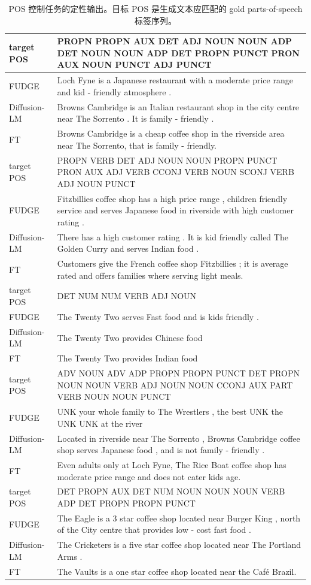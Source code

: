\documentclass{article}
\begin{document}
\begin{table}
{\begin{tabular}{lp{13cm}}
\\
\toprule
target POS &  PROPN PROPN AUX DET ADJ NOUN NOUN ADP DET NOUN NOUN ADP DET PROPN PUNCT PRON AUX NOUN PUNCT ADJ PUNCT\\
\midrule
FUDGE &  Loch Fyne is a Japanese restaurant with a moderate price range and kid - friendly atmosphere . \\
Diffusion-LM &   Browns Cambridge is an Italian restaurant shop in the city centre near The Sorrento . It is family - friendly . \\
FT &  Browns Cambridge is a cheap coffee shop in the riverside area near The Sorrento, that is family - friendly. 
\\
\toprule
target POS &  PROPN VERB DET ADJ NOUN NOUN PROPN PUNCT PRON AUX ADJ VERB CCONJ VERB NOUN SCONJ VERB ADJ NOUN PUNCT\\
\midrule
FUDGE &  Fitzbillies coffee shop has a high price range , children friendly service and serves Japanese food in riverside with high customer rating . \\
Diffusion-LM &   There has a high customer rating . It is kid friendly called The Golden Curry and serves Indian food . \\
FT &  Customers give the French coffee shop Fitzbillies ; it is average rated and offers families where serving light meals. 
\\
\toprule
target POS &  DET NUM NUM VERB ADJ NOUN\\
\midrule
FUDGE &  The Twenty Two serves Fast food and is kids friendly . \\
Diffusion-LM &  The Twenty Two provides Chinese food \\
FT &  The Twenty Two provides Indian food 
\\
\toprule
target POS &  ADV NOUN ADV ADP PROPN PROPN PUNCT DET PROPN NOUN NOUN VERB ADJ NOUN NOUN CCONJ AUX PART VERB NOUN NOUN PUNCT\\
\midrule
FUDGE &  UNK your whole family to The Wrestlers , the best UNK the UNK UNK at the river \\
Diffusion-LM &   Located in riverside near The Sorrento , Browns Cambridge coffee shop serves Japanese food , and is not family - friendly . \\
FT &  Even adults only at Loch Fyne, The Rice Boat coffee shop has moderate price range and does not cater kids age. 
\\
\toprule
target POS &  DET PROPN AUX DET NUM NOUN NOUN NOUN VERB ADP DET PROPN PROPN PUNCT\\
\midrule
FUDGE &  The Eagle is a 3 star coffee shop located near Burger King , north of the City centre that provides low - cost fast food . \\
Diffusion-LM &   The Cricketers is a five star coffee shop located near The Portland Arms . \\
FT &  The Vaults is a one star coffee shop located near the Café Brazil. 
\\

\bottomrule
\end{tabular}}
\caption{\label{app:qualitative-pos} POS 控制任务的定性输出。目标 POS 是生成文本应匹配的 gold parts-of-speech 标签序列。}
\end{table}
\end{document}
